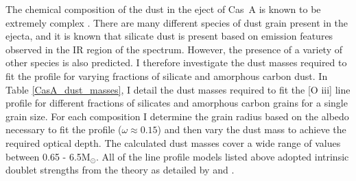 The chemical composition of the dust in the eject of Cas~A is known to be extremely complex \citep{Arendt2014}.  There are many different species of dust grain present in the ejecta, and it is known that silicate dust is present based on emission features observed in the IR region of the spectrum.  However, the presence of a variety of other species is also predicted.  I therefore investigate the dust masses required to fit the profile for varying fractions of silicate and amorphous carbon dust.  In Table \ref{CasA_dust_masses}, I detail the dust masses required to fit the [O {\sc iii}] line profile for different fractions of silicates and amorphous carbon grains for a single grain size.  For each composition I determine the grain radius based on the albedo necessary to fit the profile ($\omega\approx0.15$) and then vary the dust mass to achieve the required optical depth.  The calculated dust masses cover a wide range of values between 0.65 - 6.5M$_{\odot}$.   All of the line profile models listed above adopted intrinsic doublet strengths from the theory as detailed by \citet{Zeippen1987} and \citet{Storey2000}.  


